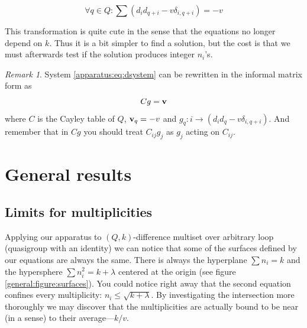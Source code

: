 \documentclass{article}
\theoremstyle{plain}
\theoremstyle{definition}
\theoremstyle{remark}
\newtheorem{remark}[theorem]{Remark}
\begin{document}
		\begin{equation}
			\label{apparatus:eq:dsystem}
			\forall q \in Q \colon \sum (d_i d_{q+i}-v\delta_{i,q+i}) = -v
		\end{equation}
		
		This transformation is quite cute in the sense that the equations no longer depend on $k$. Thus it is a bit simpler to find a solution, but the cost is that we must afterwards test if the solution produces integer $n_i$'s.
		
		\begin{remark}
            System \eqref{apparatus:eq:dsystem} can be rewritten in the informal matrix form as
            \begin{equation}
                \label{apparatus:eq:dmatrixform}
                Cg=\bf v
            \end{equation}
            where $C$ is the Cayley table of $Q$, ${\bf v}_q = -v$ and $g_q: i \rightarrow (d_i d_q -v\delta_{i,q+i})$. And remember that in $Cg$ you should treat $C_{ij}g_j$ as $g_j$ acting on $C_{ij}$.
		\end{remark}
		
    \section{General results}
        \subsection{Limits for multiplicities}
            Applying our apparatus to $(Q,k)$-difference multiset over arbitrary loop (quasigroup with an identity) we can notice that some of the surfaces defined by our equations are always the same. There is always the hyperplane $\sum {n_i} = k$ and the hypersphere $\sum n_i^2 = k + \lambda$ centered at the origin (see figure \ref{general:figure:surfaces}). You could notice right away that the second equation confines every multiplicity: $n_i \leq \sqrt{k+\lambda}$. By investigating the intersection more thoroughly we may discover that the multiplicities are actually bound to be near (in a sense) to their average---$k/v$.
\end{document}
